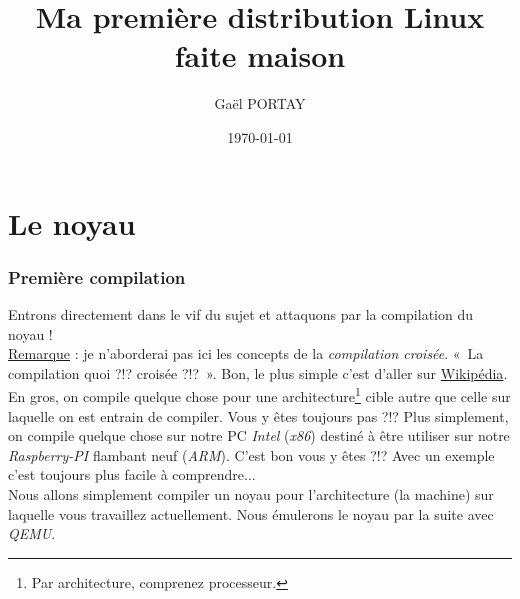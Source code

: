 \documentclass[a4paper]{article}
\title{Ma première distribution Linux faite maison}
\author{Gaël PORTAY}
\date{\today}
\begin{document}
\maketitle

\begin{abstract}
\end{abstract}

\clearpage
\tableofcontents

\clearpage
\part{Le noyau}

\section{Première compilation}


Entrons directement dans le vif du sujet et attaquons par la compilation du noyau !\\

\underline{Remarque} : je n'aborderai pas ici les concepts de la \textit{compilation croisée}. «~La compilation quoi ?!? croisée ?!?~». Bon, le plus simple c'est d'aller sur \href{https://fr.wikipedia.org/wiki/Compilateur#Compilation_crois.C3.A9e}{Wikipédia}. En gros, on compile quelque chose pour une architecture\footnote{Par architecture, comprenez processeur.}  cible autre que celle sur laquelle on est entrain de compiler. Vous y êtes toujours pas ?!? Plus simplement, on compile quelque chose sur notre PC \textit{Intel} (\textit{x86}) destiné à être utiliser sur notre \textit{Raspberry-PI} flambant neuf (\textit{ARM}). C'est bon vous y êtes ?!? Avec un exemple c'est toujours plus facile à comprendre...\\

Nous allons simplement compiler un noyau pour l'architecture (la machine) sur laquelle vous travaillez actuellement. Nous émulerons le noyau par la suite avec \textit{QEMU}.\\
\end{document}
